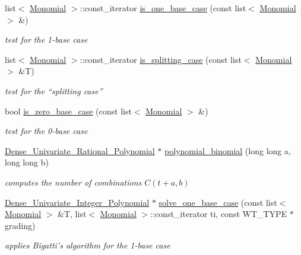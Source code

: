 \begin{DoxyCompactItemize}
list$<$ \hyperlink{group__polygroup_class_monomial}{Monomial} $>$\+::const\+\_\+iterator \hyperlink{group__commalg_gaed5cfd21d305dfc0d912bab347a82f65}{is\+\_\+one\+\_\+base\+\_\+case} (const list$<$ \hyperlink{group__polygroup_class_monomial}{Monomial} $>$ \&)
\begin{DoxyCompactList}\small\item\em test for the 1-\/base case \cite{Bigatti97} \end{DoxyCompactList}\item 
list$<$ \hyperlink{group__polygroup_class_monomial}{Monomial} $>$\+::const\+\_\+iterator \hyperlink{group__commalg_ga26c5ece1df1c4db4873925f41ed8ee9c}{is\+\_\+splitting\+\_\+case} (const list$<$ \hyperlink{group__polygroup_class_monomial}{Monomial} $>$ \&T)
\begin{DoxyCompactList}\small\item\em test for the ``splitting case'' \cite{Bigatti97} \end{DoxyCompactList}\item 
bool \hyperlink{group__commalg_gabf201296cecf6c31675c7e23bb58dbb4}{is\+\_\+zero\+\_\+base\+\_\+case} (const list$<$ \hyperlink{group__polygroup_class_monomial}{Monomial} $>$ \&)
\begin{DoxyCompactList}\small\item\em test for the 0-\/base case \cite{Bigatti97} \end{DoxyCompactList}\item 
\hyperlink{group__polygroup_class_dense___univariate___rational___polynomial}{Dense\+\_\+\+Univariate\+\_\+\+Rational\+\_\+\+Polynomial} $\ast$ \hyperlink{group__commalg_gab38a72ec7f6b744df95fd4a3058bafcb}{polynomial\+\_\+binomial} (long long a, long long b)
\begin{DoxyCompactList}\small\item\em computes the number of combinations $C(t+a,b)$ \end{DoxyCompactList}\item 
\hyperlink{group__polygroup_class_dense___univariate___integer___polynomial}{Dense\+\_\+\+Univariate\+\_\+\+Integer\+\_\+\+Polynomial} $\ast$ \hyperlink{group__commalg_ga806777263a7836e3dabc0349440c47db}{solve\+\_\+one\+\_\+base\+\_\+case} (const list$<$ \hyperlink{group__polygroup_class_monomial}{Monomial} $>$ \&T, list$<$ \hyperlink{group__polygroup_class_monomial}{Monomial} $>$\+::const\+\_\+iterator ti, const W\+T\+\_\+\+T\+Y\+PE $\ast$grading)
\begin{DoxyCompactList}\small\item\em applies Bigatti's algorithm for the 1-\/base case \end{DoxyCompactList}\item 

\end{DoxyCompactItemize}
